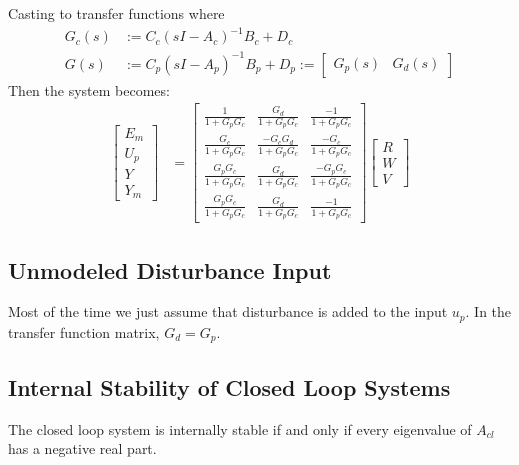 \documentclass[letterpaper,12pt]{article}
\begin{document}
Casting to transfer functions where
\begin{align*}
    G_c(s) &:= C_c (sI - A_c)^{-1} B_c + D_c \\
    G(s) &:= C_p (sI - A_p)^{-1} B_p + D_p := 
    \begin{bmatrix}
        G_p(s) & G_d(s)
    \end{bmatrix}
\end{align*}
Then the system becomes:
\begin{align*}
    \begin{bmatrix}
        E_m \\
        U_p \\
        Y \\
        Y_m
    \end{bmatrix}
    &=
    \begin{bmatrix}
        \frac{1}{1+G_p G_c} & \frac{G_d}{1+G_p G_c} & \frac{-1}{1+G_p G_c} \\
        \frac{G_c}{1+G_p G_c} & \frac{-G_c G_d}{1+G_p G_c} & \frac{-G_c}{1+G_p G_c} \\
        \frac{G_p G_c}{1+G_p G_c} & \frac{G_d}{1+G_p G_c} & \frac{-G_p G_c}{1+G_p G_c} \\
        \frac{G_p G_c}{1+G_p G_c} & \frac{G_d}{1+G_p G_c} & \frac{-1}{1+G_p G_c}
    \end{bmatrix}
    \begin{bmatrix}
        R \\
        W \\
        V
    \end{bmatrix}
\end{align*}
\subsection{Unmodeled Disturbance Input}
Most of the time we just assume that disturbance is added to the input $u_p$. In the transfer function matrix, $G_d = G_p$.
\subsection{Internal Stability of Closed Loop Systems}
The closed loop system is internally stable if and only if every eigenvalue of $A_{cl}$ has a negative real part.
\end{document}
